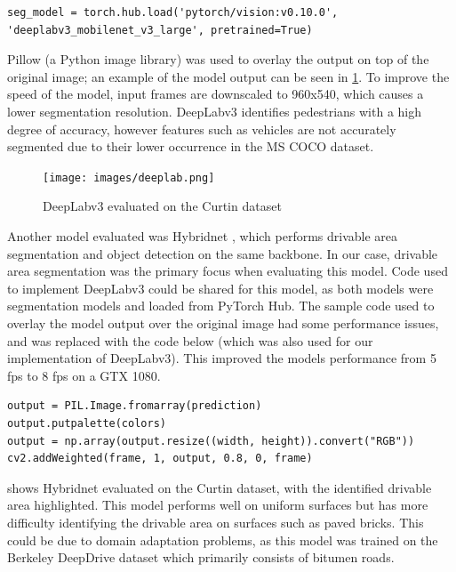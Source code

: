 \begin{verbatim}
seg_model = torch.hub.load('pytorch/vision:v0.10.0', 'deeplabv3_mobilenet_v3_large', pretrained=True)
\end{verbatim}

Pillow (a Python image library) was used to overlay the output on top of the original image;
an example of the model output can be seen in \cref{fig:deeplab}. To improve the speed of the model, input frames are
downscaled to 960x540, which causes a lower segmentation resolution.
DeepLabv3 identifies pedestrians with a high degree of accuracy, however
features such as vehicles are not accurately segmented due to their lower occurrence in the MS COCO dataset.

\begin{figure}[H]
    \centering
    \texttt{[image: images/deeplab.png]}
    \caption{DeepLabv3 evaluated on the Curtin dataset}
    \label{fig:deeplab}
\end{figure}

Another model evaluated was Hybridnet \cite{vuHybridNetsEndtoEndPerception2022}, which performs drivable area segmentation
and object detection on the same backbone. In our case, drivable area segmentation was the primary focus when evaluating this model.
Code used to implement DeepLabv3 could be shared for this model, as both models were segmentation models
and loaded from PyTorch Hub. The sample code used to overlay the model output over the original image had some
performance issues, and was replaced with the code below (which was also used for our implementation of DeepLabv3).
This improved the models performance from 5 fps to 8 fps on a GTX 1080.
\begin{verbatim}
output = PIL.Image.fromarray(prediction)
output.putpalette(colors)
output = np.array(output.resize((width, height)).convert("RGB"))
cv2.addWeighted(frame, 1, output, 0.8, 0, frame)
\end{verbatim}


 shows Hybridnet evaluated on the Curtin dataset, with the identified drivable area highlighted.
This model performs well on uniform surfaces but has more difficulty identifying the drivable area on surfaces such as paved bricks.
This could be due to domain adaptation problems, as this model was trained on the Berkeley DeepDrive dataset \cite{yuBDD100KDiverseDriving2018}
which primarily consists of bitumen roads.

